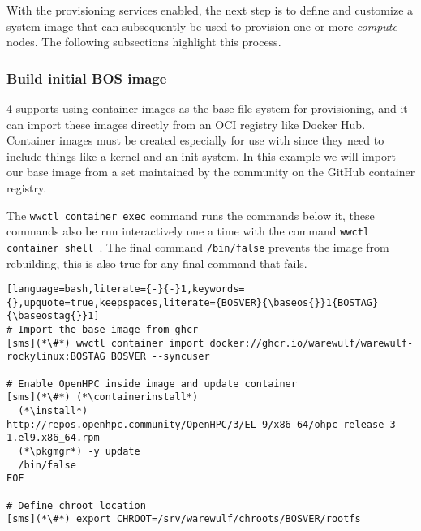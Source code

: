 With the provisioning services enabled, the next step is to define and
customize a system image that can subsequently be used to provision one or more
{\em compute} nodes. The following subsections highlight this process.

\subsubsection{Build initial BOS image} \label{sec:assemble_bos}
\Warewulf{} 4 supports using container images as the base file system for 
provisioning, and it can import these images directly from an OCI registry like
Docker Hub. Container images must be created especially for use with \Warewulf{}
since they need to include things like a kernel and an init system. In this 
example we will import our base image from a set maintained by the \Warewulf{}
community on the GitHub container registry.

The \texttt{wwctl container exec} command runs the commands below it, these commands 
also be run interactively one a time with the command \texttt{wwctl container 
shell \baseos{}}. The final command \texttt{/bin/false} prevents the image from
rebuilding, this is also true for any final command that fails.

\begin{lstlisting}[language=bash,literate={-}{-}1,keywords={},upquote=true,keepspaces,literate={BOSVER}{\baseos{}}1{BOSTAG}{\baseostag{}}1]
# Import the base image from ghcr
[sms](*\#*) wwctl container import docker://ghcr.io/warewulf/warewulf-rockylinux:BOSTAG BOSVER --syncuser

# Enable OpenHPC inside image and update container
[sms](*\#*) (*\containerinstall*)
  (*\install*) http://repos.openhpc.community/OpenHPC/3/EL_9/x86_64/ohpc-release-3-1.el9.x86_64.rpm
  (*\pkgmgr*) -y update
  /bin/false
EOF

# Define chroot location 
[sms](*\#*) export CHROOT=/srv/warewulf/chroots/BOSVER/rootfs
\end{lstlisting}
